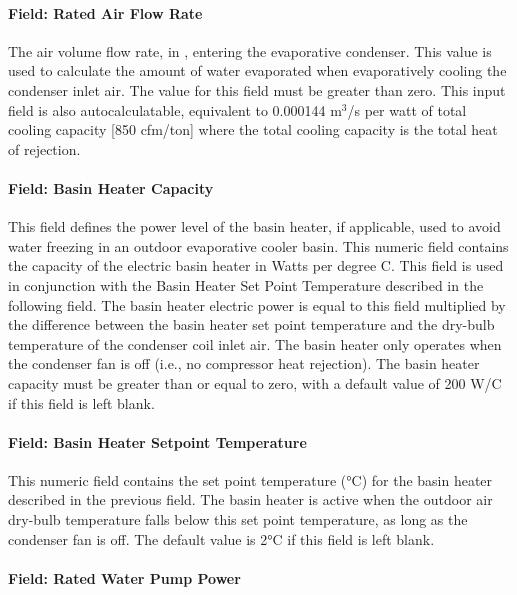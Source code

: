 \paragraph{Field: Rated Air Flow Rate}\label{field-rated-air-flow-rate-000}

The air volume flow rate, in \si{\volumeFlowRate}, entering the evaporative condenser. This value is used to calculate the amount of water evaporated when evaporatively cooling the condenser inlet air. The value for this field must be greater than zero. This input field is also autocalculatable, equivalent to 0.000144 m\(^{3}\)/s per watt of total cooling capacity {[}850 cfm/ton{]} where the total cooling capacity is the total heat of rejection.

\paragraph{Field: Basin Heater Capacity}\label{field-basin-heater-capacity-1-002}

This field defines the power level of the basin heater, if applicable, used to avoid water freezing in an outdoor evaporative cooler basin. This numeric field contains the capacity of the electric basin heater in Watts per degree C. This field is used in conjunction with the Basin Heater Set Point Temperature described in the following field. The basin heater electric power is equal to this field multiplied by the difference between the basin heater set point temperature and the dry-bulb temperature of the condenser coil inlet air. The basin heater only operates when the condenser fan is off (i.e., no compressor heat rejection). The basin heater capacity must be greater than or equal to zero, with a default value of 200 W/C if this field is left blank.

\paragraph{Field: Basin Heater Setpoint Temperature}\label{field-basin-heater-setpoint-temperature-1-002}

This numeric field contains the set point temperature (°C) for the basin heater described in the previous field. The basin heater is active when the outdoor air dry-bulb temperature falls below this set point temperature, as long as the condenser fan is off. The default value is 2°C if this field is left blank.

\paragraph{Field: Rated Water Pump Power}\label{field-rated-water-pump-power}

